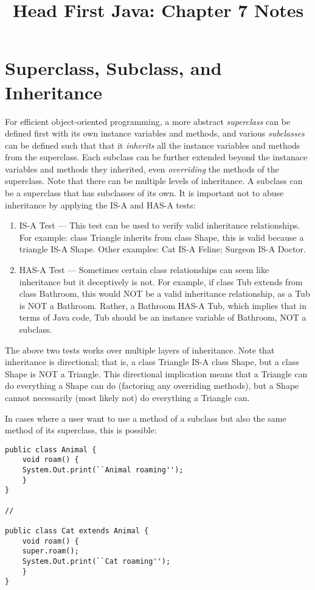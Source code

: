 \documentclass{tufte-handout}
\title{Head First Java: Chapter 7 Notes}
\begin{document}
    \maketitle

    \section*{Superclass, Subclass, and Inheritance}
    For efficient object-oriented programming, a more abstract \emph{superclass} can be defined first with its own instance variables and methods, and various \emph{subclasses} can be defined such that that it \emph{inherits} all the instance variables and methods from the superclass. Each subclass can be further extended beyond the instanace variables and methods they inherited, even \emph{overriding} the methods of the superclass. Note that there can be multiple levels of inheritance. A subclass can be a superclass that has subclasses of its own. It is important not to abuse inheritance by applying the IS-A and HAS-A tests:

    \begin{enumerate}
        \item IS-A Test --- This test can be used to verify valid inheritance relationships. For example: class Triangle inherits from class Shape, this is valid because a triangle IS-A Shape. Other examples: Cat IS-A Feline; Surgeon IS-A Doctor. 
        \item HAS-A Test --- Sometimes certain class relationships can seem like inheritance but it deceptively is not. For example, if class Tub extends from class Bathroom, this would NOT be a valid inheritance relationship, as a Tub is NOT a Bathroom. Rather, a Bathroom HAS-A Tub, which implies that in terms of Java code, Tub should be an instance variable of Bathroom, NOT a subclass.
    \end{enumerate}

    The above two tests works over multiple layers of inheritance. Note that inheritance is directional; that is, a class Triangle IS-A class Shape, but a class Shape is NOT a Triangle. This directional implication means that a Triangle can do everything a Shape can do (factoring any overriding methods), but a Shape cannot necessarily (most likely not) do everything a Triangle can.

    In cases where a user want to use a method of a subclass but also the same method of its superclass, this is possible:

    \begin{lstlisting}
public class Animal {
    void roam() {
    System.Out.print(``Animal roaming'');
    }
}

//

public class Cat extends Animal {
    void roam() {
    super.roam();
    System.Out.print(``Cat roaming'');
    }    
}
    \end{lstlisting}
\end{document}
